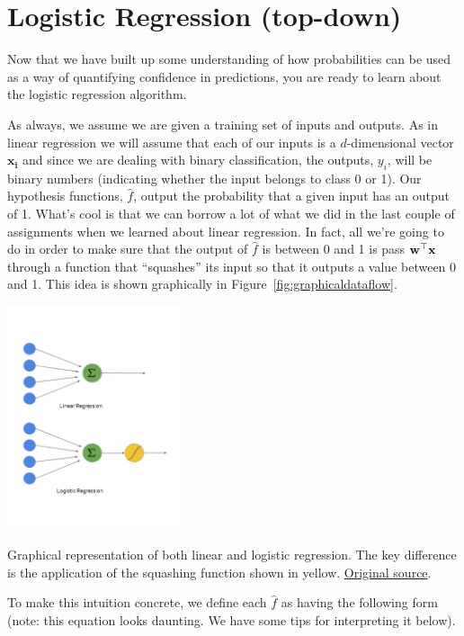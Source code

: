 \documentclass[assignment03_Solutions]{subfiles}
\begin{document}
\section{Logistic Regression (top-down)}
Now that we have built up some understanding of how probabilities can be used as a way of quantifying confidence in predictions, you are ready to learn about the logistic regression algorithm.

As always, we assume we are given a training set of inputs and outputs.  As in linear regression we will assume that each of our inputs is a $d$-dimensional vector $\mathbf{x_i}$ and since we are dealing with binary classification, the outputs, $y_i$, will be binary numbers (indicating whether the input belongs to class 0 or 1).  Our hypothesis functions, $\hat{f}$, output the probability that a given input has an output of 1.  What's cool is that we can borrow a lot of what we did in the last couple of assignments when we learned about linear regression.  In fact, all we're going to do in order to make sure that the output of $\hat{f}$ is between 0 and 1 is pass $\mathbf{w}^\top \mathbf{x}$ through a function that ``squashes'' its input so that it outputs a value between 0 and 1.  This idea is shown graphically in Figure~\ref{fig:graphicaldataflow}.

\begin{marginfigure}
\includegraphics[width=2in]{figures/linearandlogistic}
\caption{Graphical representation of both linear and logistic regression.  The key difference is the application of the squashing function shown in yellow.  \href{https://towardsdatascience.com/building-a-logistic-regression-in-python-301d27367c24}{Original source}.}\label{fig:graphicaldataflow}
\end{marginfigure}
To make this intuition concrete, we define each $\hat{f}$ as having the following form (note: this equation looks daunting. We have some tips for interpreting it below).
\end{document}
